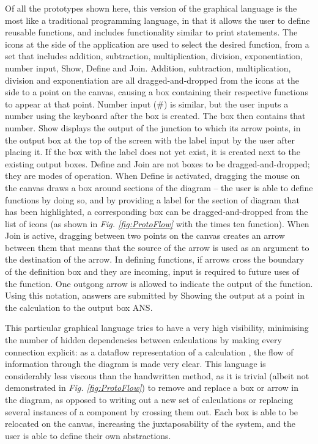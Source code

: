 \documentclass[12pt,twoside,notitlepage,xetex]{report}
\begin{document}
Of all the prototypes shown here, this version of the graphical language is the
most like a traditional programming language, in that it allows the user to
define reusable functions, and includes functionality similar to print
statements.  The icons at the side of the application are used to select the
desired function, from a set that includes addition, subtraction,
multiplication, division, exponentiation, number input, {\sfapp Show},
{\sfapp Define} and {\sfapp Join}.  Addition, subtraction, multiplication,
division and exponentiation are all dragged-and-dropped from the icons at the
side to a point on the canvas, causing a box containing their respective
functions to appear at that point.  Number input ({\sfapp \#}) is similar, but
the user inputs a number using the keyboard after the box is created.  The box
then contains that number.  {\sfapp Show} displays the output of the junction to
which its arrow points, in the output box at the top of the screen with the label
input by the user after placing it.  If the box with the label does not yet
exist, it is created next to the existing output boxes.  {\sfapp Define} and
{\sfapp Join} are not boxes to be dragged-and-dropped; they are modes of
operation.  When {\sfapp Define} is activated, dragging the mouse on the canvas
draws a box around sections of the diagram -- the user is able to define
functions by doing so, and by providing a label for the section of diagram that
has been highlighted, a corresponding box can be dragged-and-dropped from the
list of icons (as shown in \emph{Fig. \ref{fig:ProtoFlow}} with the {\sfapp times ten}
function).  When {\sfapp Join} is active, dragging between two points on the
canvas creates an arrow between them that means that the source of the arrow is
used as an argument to the destination of the arrow.  In defining functions,
if arrows cross the boundary of the definition box and they are incoming, input
is required to future uses of the function.  One outgong arrow is allowed to
indicate the output of the function.  Using this notation, answers are submitted
by {\sfapp Show}ing the output at a point in the calculation to the output box
{\sfapp ANS}.

This particular graphical language tries to have a very high visibility,
minimising the number of hidden dependencies between calculations by making
every connection explicit: as a dataflow representation of a calculation
\cite{Blackwell1998}, the flow of information through the diagram is made very
clear.  This language is considerably less viscous than the handwritten method,
as it is trivial (albeit not demonstrated in \emph{Fig. \ref{fig:ProtoFlow}}) to remove and
replace a box or arrow in the diagram, as opposed to writing out a new set of
calculations or replacing several instances of a component by crossing them
out.  Each box is able to be relocated on the canvas, increasing the
juxtaposability of the system, and the user is able to define their own
abstractions.
\end{document}
